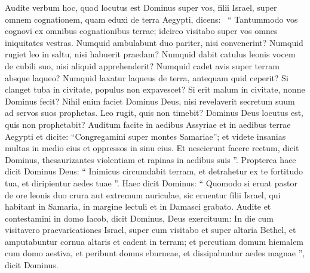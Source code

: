 \begin{biblechapter}
\begin{biblechapter}
\begin{biblechapter}
 \verse Audite verbum hoc, quod locutus est Dominus super vos, filii Israel, super omnem cognationem, quam eduxi de terra Aegypti, dicens: 
 \verse “ Tantummodo vos cognovi
 ex omnibus cognationibus terrae;
 idcirco visitabo super vos
 omnes iniquitates vestras.
 \verse Numquid ambulabunt duo pariter, nisi convenerint?
 \verse Numquid rugiet leo in saltu,
 nisi habuerit praedam?
 Numquid dabit catulus leonis vocem de cubili suo,
 nisi aliquid apprehenderit?
 \verse Numquid cadet avis super terram
 absque laqueo?
 Numquid laxatur laqueus de terra, antequam quid ceperit?
 \verse Si clanget tuba in civitate,
 populus non expavescet?
 Si erit malum in civitate,
 nonne Dominus fecit?
 \verse Nihil enim faciet Dominus Deus,
 nisi revelaverit secretum suum
 ad servos suos prophetas.
 \verse Leo rugit,
 quis non timebit?
 Dominus Deus locutus est,
 quis non prophetabit?
 \verse Auditum facite in aedibus Assyriae
 et in aedibus terrae Aegypti
 et dicite: “Congregamini super montes Samariae”;
 et videte insanias multas in medio eius
 et oppressos in sinu eius.
 \verse Et nescierunt facere rectum,
 dicit Dominus,
 thesaurizantes violentiam et rapinas
 in aedibus suis ”.
 \verse Propterea haec dicit Dominus Deus:
 “ Inimicus circumdabit terram,
 et detrahetur ex te fortitudo tua,
 et diripientur aedes tuae ”.
 \verse Haec dicit Dominus:
 “ Quomodo si eruat pastor de ore leonis
 duo crura aut extremum auriculae, sic eruentur filii Israel,
 qui habitant in Samaria,
 in margine lectuli
 et in Damasci grabato.
 \verse Audite et contestamini in domo Iacob,
 dicit Dominus, Deus exercituum:
 \verse In die cum visitavero praevaricationes Israel,
 super eum visitabo et super altaria Bethel,
 et amputabuntur cornua altaris
 et cadent in terram;
 \verse et percutiam domum hiemalem
 cum domo aestiva,
 et peribunt domus eburneae,
 et dissipabuntur aedes magnae ”,
 dicit Dominus.
 

\end{biblechapter}
\end{biblechapter}
\end{biblechapter}
